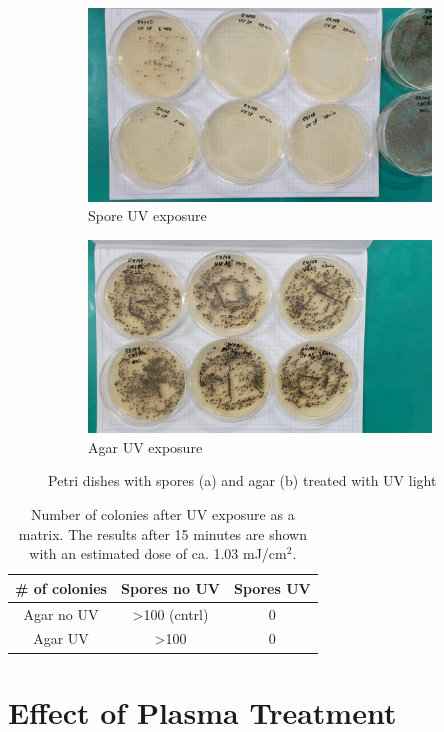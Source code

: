 \begin{figure}
    \centering
    \begin{subfigure}[b]{0.6\textwidth}
        \centering
        \includegraphics[width=\textwidth]{images/UV_SP.jpeg}
        \caption{Spore UV exposure}
        \label{fig:uv_a}
    \end{subfigure}
    \vfill
    \begin{subfigure}[b]{0.6\textwidth}
        \centering
        \includegraphics[width=\textwidth]{images/UV_AG.jpeg}
        \caption{Agar UV exposure}
        \label{fig:uv_b}
    \end{subfigure}
    \caption[Photograph of Petri dishes after treatment]{Petri dishes with spores (a) and agar (b) treated with UV light}
    \label{fig:uv_experiment}
\end{figure}

\begin{table}
    \centering
    \caption[Number of colonies after UV exposure as a matrix]{Number of colonies after UV exposure as a matrix. The results after 15 minutes are shown with an estimated dose of ca. 1.03 mJ/cm$^2$.}
    \vspace*{1em}
    \renewcommand{\arraystretch}{1.4}
    \setlength{\tabcolsep}{12pt}
    \begin{tabular}{c|cc}
        {\# of colonies} & {Spores no UV} & {Spores UV} \\
        \hline
        Agar no UV & >100 (cntrl) & 0 \\
        Agar UV    & >100 & 0 \\
    \end{tabular}
    \label{tab:uv_matrix}
\end{table}


\section{Effect of Plasma Treatment}